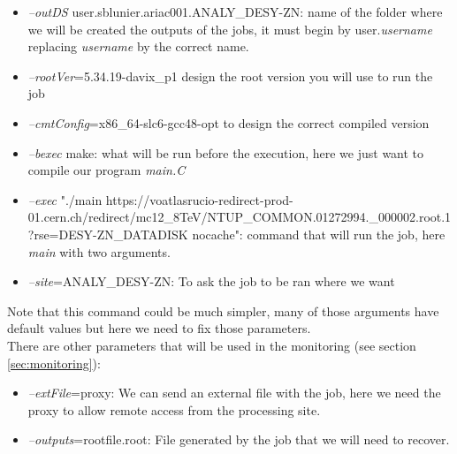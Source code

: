 \begin{itemize}
	\item \textit{--outDS} user.sblunier.ariac001.ANALY\_DESY-ZN: name of the folder where we will be created the outputs of the jobs, it must begin by user.\textit{username} replacing \textit{username} by the correct name.
	\item \textit{--rootVer}=5.34.19-davix\_p1 design the root version you will use to run the job
	\item \textit{--cmtConfig}=x86\_64-slc6-gcc48-opt to design the correct compiled version
	\item \textit{--bexec} make: what will be run before the execution, here we just want to compile our program \textit{main.C}
	\item \textit{--exec} "./main https://voatlasrucio-redirect-prod-01.cern.ch/redirect/mc12\_8TeV/NTUP\_COMMON.01272994.\_000002.root.1?rse=DESY-ZN\_DATADISK nocache": command that will run the job, here \textit{main} with two arguments.
	\item \textit{--site}=ANALY\_DESY-ZN: To ask the job to be ran where we want
\end{itemize}

Note that this command could be much simpler, many of those arguments have default values but here we need to fix those parameters.\\

There are other parameters that will be used in the monitoring (see section \ref{sec:monitoring}):

\begin{itemize}
	\item \textit{--extFile}=proxy: We can send an external file with the job, here we need the proxy to allow remote access from the processing site.
	\item \textit{--outputs}=rootfile.root: File generated by the job that we will need to recover.
\end{itemize}
